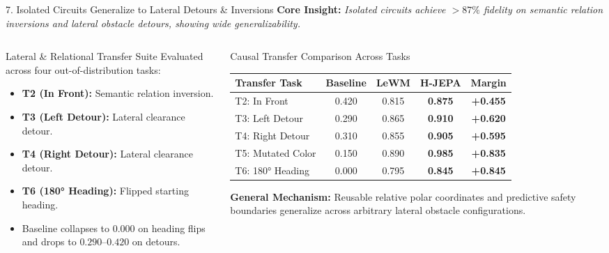 \documentclass[aspectratio=169, 10pt]{beamer}
\begin{document}
\begin{frame}{7. Isolated Circuits Generalize to Lateral Detours \& Inversions}
  \textbf{Core Insight:} \textit{Isolated circuits achieve $>87\%$ fidelity on semantic relation inversions and lateral obstacle detours, showing wide generalizability.}

  \vspace{0.2cm}
  \begin{columns}[T]
    \begin{column}{0.48\textwidth}
      \begin{block}{Lateral \& Relational Transfer Suite}
        \small
        Evaluated across four out-of-distribution tasks:
        \begin{itemize}
          \item \textbf{T2 (In Front):} Semantic relation inversion.
          \item \textbf{T3 (Left Detour):} Lateral clearance detour.
          \item \textbf{T4 (Right Detour):} Lateral clearance detour.
          \item \textbf{T6 (180° Heading):} Flipped starting heading.
          \item Baseline collapses to \alert{0.000} on heading flips and drops to $0.290$--$0.420$ on detours.
        \end{itemize}
      \end{block}
    \end{column}

    \begin{column}{0.48\textwidth}
      \begin{block}{Causal Transfer Comparison Across Tasks}
        \scriptsize
        \centering
        \setlength{\tabcolsep}{2.5pt}
        \begin{tabular}{lcccc}
          \toprule
          \textbf{Transfer Task} & \textbf{Baseline} & \textbf{LeWM} & \textbf{H-JEPA} & \textbf{Margin} \\
          \midrule
          T2: In Front & 0.420 & 0.815 & \textbf{0.875} & \textbf{+0.455} \\
          T3: Left Detour & 0.290 & 0.865 & \textbf{0.910} & \textbf{+0.620} \\
          T4: Right Detour & 0.310 & 0.855 & \textbf{0.905} & \textbf{+0.595} \\
          T5: Mutated Color & 0.150 & 0.890 & \textbf{0.985} & \textbf{+0.835} \\
          T6: 180° Heading & \alert{0.000} & 0.795 & \textbf{0.845} & \textbf{+0.845} \\
          \bottomrule
        \end{tabular}
      \end{block}
      \vspace{0.05cm}
      \scriptsize \textbf{General Mechanism:} Reusable relative polar coordinates and predictive safety boundaries generalize across arbitrary lateral obstacle configurations.
    \end{column}
  \end{columns}
\end{frame}
\end{document}
